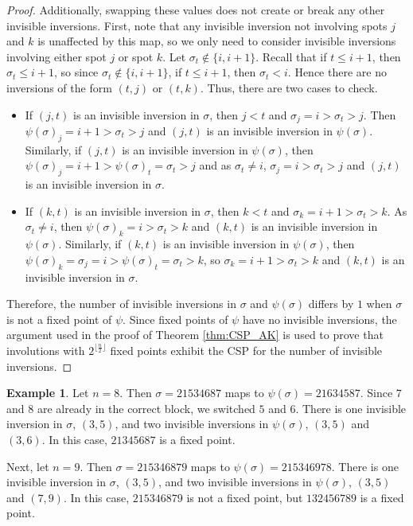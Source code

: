 \documentclass{amsart}
\theoremstyle{definition}
\newtheorem{example}[thm]{Example}
\begin{document}
\begin{proof}
  Additionally, swapping these values does not create or break any other invisible inversions. First, note that any invisible inversion not involving spots $j$ and $k$ is unaffected by this map, so we only need to consider invisible inversions involving either spot $j$ or spot $k$.  Let $\sigma_t \notin \{i, i+1\}$. Recall that if $t \leq i + 1$, then $\sigma_t \leq i + 1$, so since $\sigma_t \notin \{i, i + 1\}$, if $t \leq i + 1$, then $\sigma_t < i$.
  Hence there are no inversions of the form $(t, j)$ or $(t, k)$. Thus, there are two cases to check.

  \begin{itemize}

    \item If $(j, t)$ is an invisible inversion in $\sigma$, then $j < t$ and $\sigma_j = i > \sigma_t > j$. Then $\psi(\sigma)_j = i + 1 > \sigma_t > j$ and $(j, t)$ is an invisible inversion in $\psi(\sigma)$. Similarly, if $(j, t)$ is an invisible inversion in $\psi(\sigma)$, then $\psi(\sigma)_j = i + 1 > \psi(\sigma)_t = \sigma_t > j$ and as $\sigma_t \neq i$, $\sigma_j = i > \sigma_t > j$ and $(j, t)$ is an invisible inversion in $\sigma$.

    \item If $(k, t)$ is an invisible inversion in $\sigma$, then $k < t$ and $\sigma_k = i + 1 > \sigma_t > k$. As $\sigma_t \neq i$, then $\psi(\sigma)_k = i > \sigma_t > k$ and $(k, t)$ is an invisible inversion in $\psi(\sigma)$. Similarly, if $(k, t)$ is an invisible inversion in $\psi(\sigma)$, then $\psi(\sigma)_k = \sigma_j = i  > \psi(\sigma)_t = \sigma_t > k$, so $\sigma_k = i + 1 > \sigma_t > k$ and $(k, t)$ is an invisible inversion in $\sigma$.

\end{itemize}
Therefore, the number of invisible inversions in $\sigma$ and $\psi(\sigma)$ differs by $1$ when $\sigma$ is not a fixed point of $\psi$. Since fixed points of $\psi$ have no invisible inversions, the argument used in the proof of Theorem \ref{thm:CSP_AK} is used to prove that involutions with $2^{\lfloor \frac{n}{2}\rfloor}$ fixed points exhibit the CSP for the number of invisible inversions.
\end{proof}

\begin{example}
  \label{ex:kappa_psi}
  Let $n = 8$. Then $\sigma = 21534687$ maps to $\psi(\sigma) = 21634587$.  Since $7$ and $8$ are already in the correct block, we switched $5$ and $6$. There is one invisible inversion in $\sigma$, $(3,5)$, and two invisible inversions in $\psi(\sigma)$, $(3, 5)$ and $(3, 6)$. In this case, $21345687$ is a fixed point.

  Next, let $n = 9$. Then $\sigma = 215346879$ maps to $\psi(\sigma) = 215346978$.  There is one invisible inversion in $\sigma$, $(3, 5)$, and two invisible inversions in $\psi(\sigma)$, $(3, 5)$ and $(7, 9)$. In this case, $215346879$ is not a fixed point, but $132456789$ is a fixed point.

\end{example}
\end{document}
